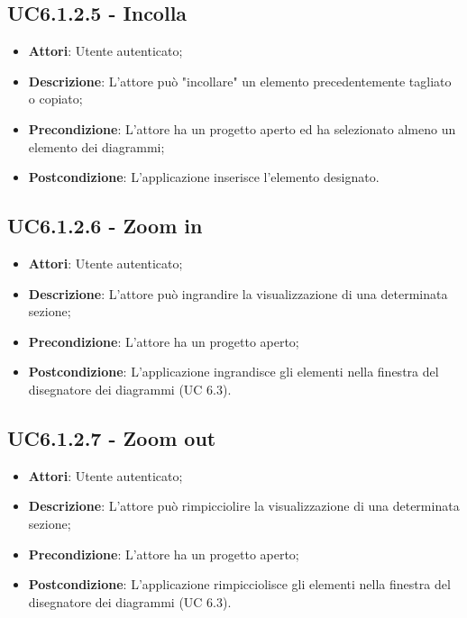 \subsection{UC6.1.2.5 - Incolla} 
\label{ssec:UC6.1.2.5} 
\begin{itemize} 
\item \textbf{Attori}: Utente autenticato;
\item \textbf{Descrizione}: L’attore può "incollare" un elemento precedentemente tagliato o copiato;
\item \textbf{Precondizione}: L’attore ha un progetto aperto ed ha selezionato almeno un elemento dei diagrammi;
\item \textbf{Postcondizione}: L’applicazione inserisce l’elemento designato.
\end{itemize} 
\subsection{UC6.1.2.6 - Zoom in} 
\label{ssec:UC6.1.2.6} 
\begin{itemize} 
\item \textbf{Attori}: Utente autenticato;
\item \textbf{Descrizione}: L’attore può ingrandire la visualizzazione di una determinata sezione;
\item \textbf{Precondizione}: L’attore ha un progetto aperto;
\item \textbf{Postcondizione}: L’applicazione ingrandisce gli elementi nella finestra del disegnatore dei diagrammi (UC 6.3).
\end{itemize} 
\subsection{UC6.1.2.7 - Zoom out} 
\label{ssec:UC6.1.2.7} 
\begin{itemize} 
\item \textbf{Attori}: Utente autenticato;
\item \textbf{Descrizione}: L’attore può rimpicciolire la visualizzazione di una determinata sezione;
\item \textbf{Precondizione}: L’attore ha un progetto aperto;
\item \textbf{Postcondizione}: L’applicazione rimpicciolisce gli elementi nella finestra del disegnatore dei diagrammi (UC 6.3).
\end{itemize} 
\newpage
